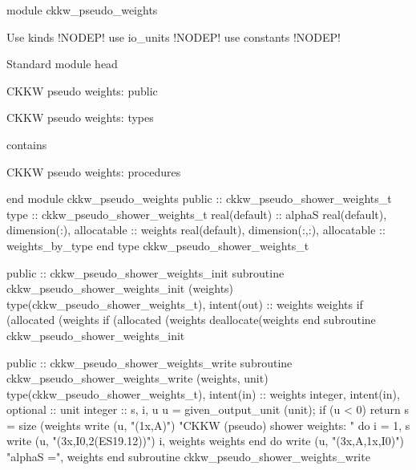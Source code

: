 module ckkw_pseudo_weights

\LA{}Use kinds\RA{} !NODEP!
  use io_units !NODEP!
  use constants !NODEP!

\LA{}Standard module head\RA{}

\LA{}CKKW pseudo weights: public\RA{}

\LA{}CKKW pseudo weights: types\RA{}

contains

\LA{}CKKW pseudo weights: procedures\RA{}

end module ckkw_pseudo_weights
\eatline
\nwendcode{}\nwdocspar
\nwenddocs{}\endmoddef
  public :: ckkw_pseudo_shower_weights_t
\nwendcode{}\endmoddef
  type :: ckkw_pseudo_shower_weights_t
     real(default) :: alphaS
     real(default), dimension(:), allocatable :: weights
     real(default), dimension(:,:), allocatable :: weights_by_type
  end type ckkw_pseudo_shower_weights_t

\eatline
\nwendcode{}\nwdocspar
\nwenddocs{}\plusendmoddef
  public :: ckkw_pseudo_shower_weights_init
\nwendcode{}\endmoddef
  subroutine ckkw_pseudo_shower_weights_init (weights)
    type(ckkw_pseudo_shower_weights_t), intent(out) :: weights
    weights%
    if (allocated (weights%
    if (allocated (weights%
         deallocate(weights%
  end subroutine ckkw_pseudo_shower_weights_init

\eatline
\nwendcode{}\nwdocspar
\nwenddocs{}\plusendmoddef
  public :: ckkw_pseudo_shower_weights_write
\nwendcode{}\plusendmoddef
  subroutine ckkw_pseudo_shower_weights_write (weights, unit)
    type(ckkw_pseudo_shower_weights_t), intent(in) :: weights
    integer, intent(in), optional :: unit
    integer :: s, i, u
    u = given_output_unit (unit); if (u < 0) return
    s = size (weights%
    write (u, "(1x,A)")  "CKKW (pseudo) shower weights: "
    do i = 1, s
       write (u, "(3x,I0,2(ES19.12))")  i, weights%
            weights%
    end do
    write (u, "(3x,A,1x,I0)")  "alphaS =", weights%
  end subroutine ckkw_pseudo_shower_weights_write

